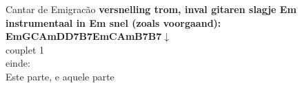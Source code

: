 \begin{song}[fado]{Cantar de Emigracão}
\textbf{versnelling trom, inval gitaren slagje Em}\\
\textbf{instrumentaal in Em snel (zoals voorgaand):\\Em\phantom{xxx}G\phantom{xxx}C\phantom{xi}Am\phantom{xi}D\phantom{xxx}D7\phantom{xi}B7\phantom{xi}Em\phantom{xxx}C\phantom{xi}Am\phantom{xi}B7\phantom{xi}B7$\downarrow$}\\
	couplet 1\\
	einde:\\
	Este parte, e aquele parte
\end{song}
